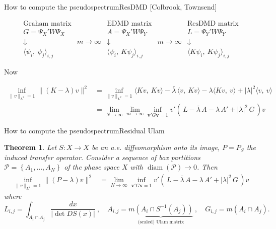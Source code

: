 \documentclass[
  english,            %
  aspectratio=169,    %
]{tumbeamer}
\newtheorem{theorem}{Theorem}
\newcommand{\cP}{\mathcal{P}}
\newcommand{\bv}{\mathbf{v}}
\newcommand{\diam}{\mathop{\textrm{diam}}}
\begin{document}
\begin{frame}{How to compute the pseudospectrum}{ResDMD [Colbrook, Townsend]}
  
\begin{equation}
  \begin{matrix}
    \text{Graham matrix} & & \text{EDMD matrix} & & \text{ResDMD matrix} \\ 
    G = \Psi_X ' W \Psi_X &  &A = \Psi_X ' W \Psi_Y & &  L = \Psi_Y ' W \Psi_Y \\ 
    \downarrow & \scriptstyle{m \to \infty} & \downarrow & \scriptstyle{m \to \infty} & \downarrow \\ 
    \langle \psi_i,\ \psi_j \rangle_{i,j} & & \langle \psi_i,\ K\psi_j \rangle_{i,j} & & \langle K \psi_i,\ K \psi_j \rangle_{i,j}
  \end{matrix}
\end{equation}

Now

\begin{align}
  \inf_{\| v \|_{L^2} = 1} \| (K - \lambda) v \|^2 &= \inf_{\| v \|_{L^2} = 1} 
  \langle K v,\ K v \rangle - \bar{\lambda} \,\langle v,\ K v \rangle - \lambda \langle K v,\ v \rangle + |\lambda|^2 \langle v,\ v \rangle \\
  &= \lim_{N \to \infty} \lim_{m \to \infty} \inf_{\bv' G \bv = 1} v' (\, L - \bar{\lambda}\, A - \lambda\, A' + |\lambda|^2 \,G \,) v
\end{align}

\end{frame}

\begin{frame}{How to compute the pseudospectrum}{Residual Ulam}

\begin{theorem}
  Let $S : X \to X$ be an a.e. diffeomorphism onto its image, $P = P_S$ the induced transfer operator. Consider a sequence of box partitions $\cP = \left\{ A_1, \ldots, A_N \right\}$ of the phase space $X$ with $\diam (\cP) \to 0$. Then 
  \begin{align}
    \inf_{\| v \|_{L^2} = 1} \| (P - \lambda) v \|^2 
    &= \lim_{N \to \infty} \inf_{\bv' G \bv = 1} v' (\, L - \bar{\lambda}\, A - \lambda\, A' + |\lambda|^2 \,G \,) v
  \end{align}
  where 
  \begin{equation}
    L_{i,j} = \int_{A_i \cap A_j} \frac{dx}{| \det DS (x) |}
    \ , \quad 
    A_{i,j} = \underbrace{m(A_i \cap S^{-1} (A_j))}_{\text{(scaled) Ulam matrix}}
    \ , \quad 
    G_{i,j} = m(A_i \cap A_j) . 
  \end{equation}
\end{theorem}
\end{frame}
\end{document}

